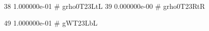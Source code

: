    38 1.000000e-01 # grho0T23LtL 
   39 0.000000e-00 # grho0T23RtR 
   
   49 1.000000e-01 # gWT23LbL    
